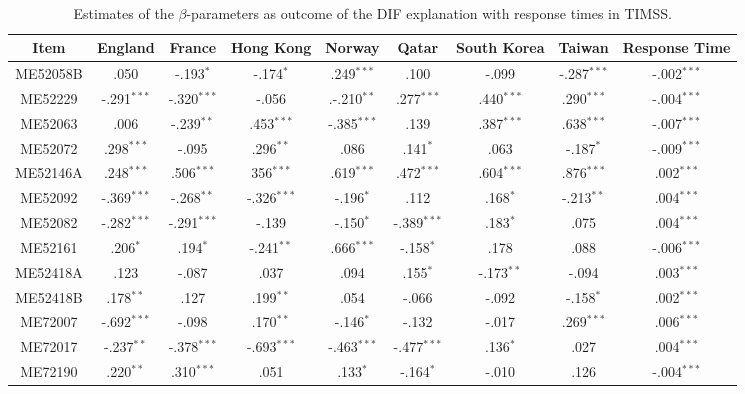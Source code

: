 \documentclass{interact}
\begin{document}
\pagestyle{empty}
\begin{landscape}
\begin{table}[hp]
 \caption{\label{tab:6 explanation}\\
 Estimates of the $\beta$-parameters as outcome of the DIF explanation with response times in TIMSS.}
    \begin{tabular}{c | c c c c c c c c}
    \hline\hline
     Item & England & France & Hong Kong & Norway & Qatar & South Korea & Taiwan & Response Time\\
     \hline
      ME52058B & .050 & -.193$^{*}$ & -.174$^{*}$ & .249$^{***}$ & .100 & -.099 & -.287$^{***}$ & -.002$^{***}$\\
      ME52229 & -.291$^{***}$ & -.320$^{***}$ & -.056 & .-.210$^{**}$ & .277$^{***}$ & .440$^{***}$ & .290$^{***}$ & -.004$^{***}$ \\
      ME52063 & .006 & -.239$^{**}$ & .453$^{***}$ & -.385$^{***}$ & .139 & .387$^{***}$ & .638$^{***}$ & -.007$^{***}$ \\
      ME52072 & .298$^{***}$ & -.095 & .296$^{**}$ & .086 & .141$^{*}$ & .063 & -.187$^{*}$ & -.009$^{***}$ \\
      ME52146A & .248$^{***}$ & .506$^{***}$ & 356$^{***}$ & .619$^{***}$ & .472$^{***}$ & .604$^{***}$ & .876$^{***}$ & .002$^{***}$\\
      ME52092 & -.369$^{***}$ & -.268$^{**}$ & -.326$^{***}$ & -.196$^{*}$ & .112 & .168$^{*}$ & -.213$^{**}$ & .004$^{***}$\\
      ME52082 & -.282$^{***}$ & -.291$^{***}$ & -.139 & -.150$^{*}$ & -.389$^{***}$ & .183$^{*}$ & .075 & .004$^{***}$\\
      ME52161 & .206$^{*}$ & .194$^{*}$ & -.241$^{**}$ & .666$^{***}$ & -.158$^{*}$ & .178 & .088 & -.006$^{***}$\\
      ME52418A & .123 & -.087 & .037 & .094 & .155$^{*}$ & -.173$^{**}$ & -.094 & .003$^{***}$\\
      ME52418B & .178$^{**}$ & .127 & .199$^{**}$ & .054 & -.066 & -.092 & -.158$^{*}$ & .002$^{***}$\\
      ME72007 & -.692$^{***}$ & -.098 & .170$^{**}$ & -.146$^{*}$ & -.132 & -.017 & .269$^{***}$ & .006$^{***}$\\
      ME72017 & -.237$^{**}$ & -.378$^{***}$ & -.693$^{***}$ & -.463$^{***}$ & -.477$^{***}$ & .136$^{*}$ & .027 & .004$^{***}$ \\
      ME72190 & .220$^{**}$ & .310$^{***}$ & .051 & .133$^{*}$ & -.164$^{*}$ & -.010 & .126 & -.004$^{***}$ \\

\end{tabular}
\end{table}
\end{landscape}
\end{document}
